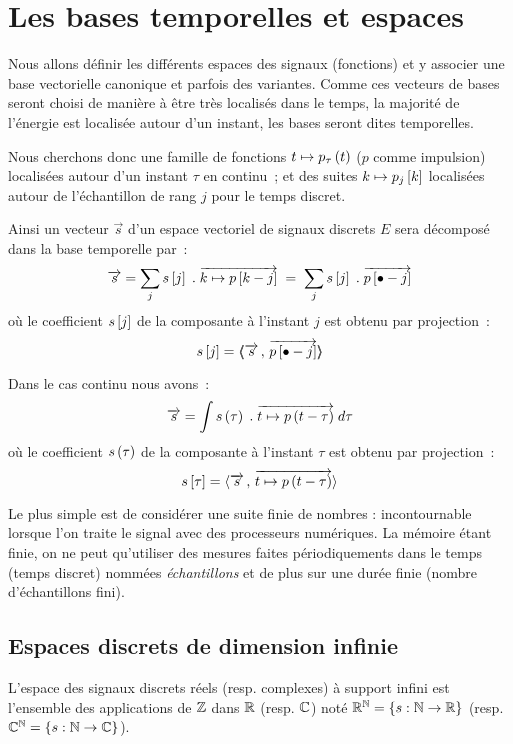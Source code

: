 \section{Les bases temporelles et espaces}
Nous allons définir les différents espaces des signaux (fonctions) et
y associer une base vectorielle \og canonique\fg{} et parfois des
variantes. Comme ces vecteurs de bases seront choisi de manière à être
très localisés dans le temps, la majorité de l'énergie est localisée
autour d'un instant, les bases seront dites temporelles.

Nous cherchons donc une famille de fonctions $t\mapsto p_\tau\left(t\right)$
($p$ comme impulsion) localisées autour d'un instant $\tau$ en
continu~; et des suites $k\mapsto p_{j}\left[k\right]$ localisées autour de
l'échantillon de rang $j$ pour le temps discret.

Ainsi un vecteur $\vec{s}$ d'un espace vectoriel de signaux discrets $E$ sera décomposé dans la base temporelle par~:
$$ \overrightarrow{s} = \sum\limits_j s\left[j\right]\;.\;\overrightarrow{k \mapsto p\left[k-j\right]} \;=\; \sum\limits_j  s\left[j\right]\;.\;\overrightarrow{p\left[\bullet-j\right]} $$
où le coefficient $s\left[j\right]$ de la composante à l'instant $j$ est obtenu
par projection~:
$$ s\left[j\right] = \langle\!\!\langle\overrightarrow{s}\,,\,\overrightarrow{p\left[\bullet-j\right]}\rangle\!\!\rangle$$

Dans le cas continu nous avons~:
$$ \overrightarrow{s} = \int s\left(\tau\right)\;.\;\overrightarrow{t \mapsto p\left(t-\tau\right)}\; d\tau$$
où le coefficient $s\left(\tau\right)$ de la composante à l'instant $\tau$ est obtenu
par projection~:
$$ s\left[\tau\right] = \langle\overrightarrow{s}\,,\,\overrightarrow{t \mapsto p\left(t-\tau\right)}\rangle$$

Le plus simple est de considérer une suite finie de nombres :
incontournable lorsque l'on traite le signal avec des processeurs
numériques.  La mémoire étant finie, on ne peut qu'utiliser des
mesures faites périodiquements dans le temps (temps discret) nommées
\emph{échantillons} et de plus sur une durée finie (nombre
d'échantillons fini).


\subsection{Espaces discrets de dimension infinie}
\label{sec:RN}
L'espace des signaux discrets réels (resp. complexes) à support infini
est l'ensemble des applications de $\mathbb{Z}$ dans $\mathbb{R}$ (resp. $\mathbb{C}$) noté
$\mathbb{R}^{\mathbb{N}} = \left\{s : \mathbb{N} \to \mathbb{R} \right\}$ (resp.
$\mathbb{C}^{\mathbb{N}} = \left\{s : \mathbb{N} \to \mathbb{C} \right\}$).

